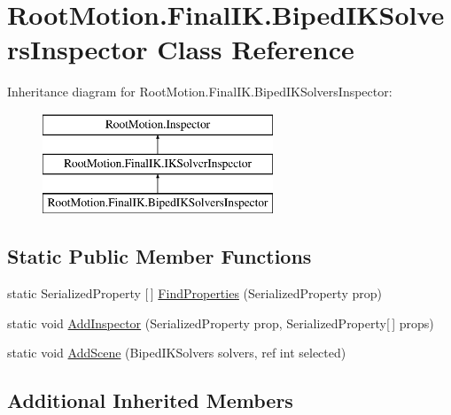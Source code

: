 \hypertarget{class_root_motion_1_1_final_i_k_1_1_biped_i_k_solvers_inspector}{}\section{Root\+Motion.\+Final\+I\+K.\+Biped\+I\+K\+Solvers\+Inspector Class Reference}
\label{class_root_motion_1_1_final_i_k_1_1_biped_i_k_solvers_inspector}
Inheritance diagram for Root\+Motion.\+Final\+I\+K.\+Biped\+I\+K\+Solvers\+Inspector\+:\begin{figure}[H]
\begin{center}
\leavevmode
\includegraphics[height=3.000000cm]{class_root_motion_1_1_final_i_k_1_1_biped_i_k_solvers_inspector}
\end{center}
\end{figure}
\subsection*{Static Public Member Functions}
\begin{DoxyCompactItemize}
\item 
static Serialized\+Property \mbox{[}$\,$\mbox{]} \mbox{\hyperlink{class_root_motion_1_1_final_i_k_1_1_biped_i_k_solvers_inspector_a5960c0a01cbc595a4a9f981aaebed6ff}{Find\+Properties}} (Serialized\+Property prop)
\item 
static void \mbox{\hyperlink{class_root_motion_1_1_final_i_k_1_1_biped_i_k_solvers_inspector_a8b570cb14aa8076cc2db13afd5b1d08d}{Add\+Inspector}} (Serialized\+Property prop, Serialized\+Property\mbox{[}$\,$\mbox{]} props)
\item 
static void \mbox{\hyperlink{class_root_motion_1_1_final_i_k_1_1_biped_i_k_solvers_inspector_a805ae9149112b15235d8daf7cc3a0b2d}{Add\+Scene}} (Biped\+I\+K\+Solvers solvers, ref int selected)
\end{DoxyCompactItemize}
\subsection*{Additional Inherited Members}



